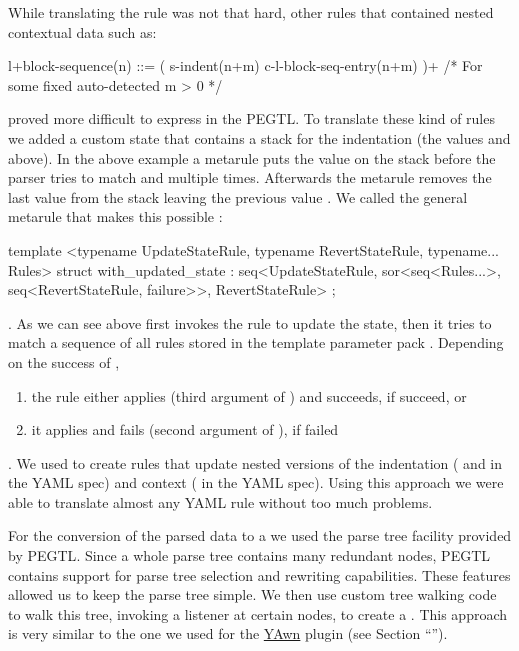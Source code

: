 While translating the rule  was not that hard, other rules that contained nested contextual data such as:

\begin{ccode}
l+block-sequence(n) ::= ( s-indent(n+m) c-l-block-seq-entry(n+m) )+
                        /* For some fixed auto-detected m > 0 */
\end{ccode}

proved more difficult to express in the PEGTL. To translate these kind of rules we added a custom state that contains a stack for the indentation (the values  and  above). In the above example a metarule puts the value  on the stack before the parser tries to match  and  multiple times. Afterwards the metarule removes the last value from the stack leaving the previous value . We called the general metarule that makes this possible :

\begin{cppcode}
  template <typename UpdateStateRule,
            typename RevertStateRule,
            typename... Rules>
  struct with_updated_state :
  seq<UpdateStateRule,
      sor<seq<Rules...>,
          seq<RevertStateRule, failure>>,
      RevertStateRule> {};
\end{cppcode}

. As we can see above  first invokes the rule  to update the state, then it tries to match a sequence of all rules stored in the template parameter pack . Depending on the success of ,

\begin{enumerate}
  \item the rule  either applies  (third argument of ) and succeeds, if  succeed, or
  \item it applies  and fails (second argument of ), if  failed
\end{enumerate}

. We used  to create rules that update nested versions of the indentation ( and  in the YAML spec) and context ( in the YAML spec). Using this approach we were able to translate almost any YAML rule without too much problems.

For the conversion of the parsed data to a  we used the parse tree facility provided by \gls{PEGTL}. Since a whole parse tree contains many redundant nodes, \gls{PEGTL} contains support for parse tree selection and rewriting capabilities. These features allowed us to keep the parse tree simple. We then use custom tree walking code to walk this tree, invoking a listener at certain nodes, to create a . This approach is very similar to the one we used for the \href{https://www.libelektra.org/plugins/yawn}{YAwn} plugin (see Section “”).


